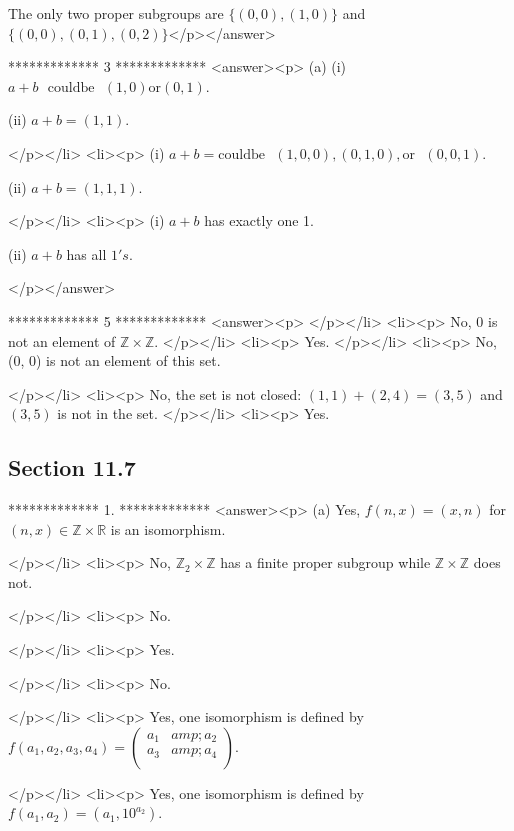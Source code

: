 The only two proper subgroups are \(\{(0, 0), (1, 0)\}\) and \(\{(0, 0), (0, 1), (0, 2)\}\)</p></answer>


*************
3
*************
<answer><p> (a) (i) \(a + b\text{  }\text{could} \text{be}\text{  }(1, 0) \text{or} (0, 1)\). 



(ii)  \(a + b = (1, 1)\).

</p></li>
<li><p> (i) \(a + b = \text{could} \text{be}\text{  }(1, 0, 0), (0, 1, 0), \text{or}\text{  }(0, 0, 1)\). 



(ii) \(a + b = (1, 1, 1)\).

</p></li>
<li><p> (i) \(a + b\) has exactly one 1.



(ii) \(a + b\) has all \(1's\).

</p></answer>


*************
5
*************
<answer><p> </p></li>
<li><p>  No,  0 is not an element of \(\mathbb{Z} \times \mathbb{Z}\).  </p></li>
<li><p> Yes. </p></li>
<li><p> No, (0, 0) is not an element of this set.



     </p></li>
<li><p> No, the set is not closed: \((1, 1) + (2, 4) = (3, 5)\) and \((3, 5)\) is not in the set. </p></li>
<li><p> Yes.


\subsection{Section 11.7}

*************
1.
*************
<answer><p> (a) Yes, \(f(n, x) = (x, n)\) for \((n, x) \in  \mathbb{Z} \times  \mathbb{R}\) is an isomorphism. 

</p></li>
<li><p> No, \(\mathbb{Z}_2\times  \mathbb{Z}\) has a finite proper subgroup while \(\mathbb{Z} \times  \mathbb{Z}\) does not.

</p></li>
<li><p> No. 

</p></li>
<li><p> Yes.

</p></li>
<li><p>  No. 

</p></li>
<li><p> Yes,  one isomorphism is defined by \(f\left(a_1, a_2,a_3,a_4\right)=\left(
\begin{array}{cc}
 a_1 &amp; a_2 \\
 a_3 &amp; a_4 \\
\end{array}
\right)\). 

</p></li>
<li><p> Yes, one isomorphism is defined by \(f\left(a_1,a_2\right)=\left(a_1,10^{a_2}\right)\). 

